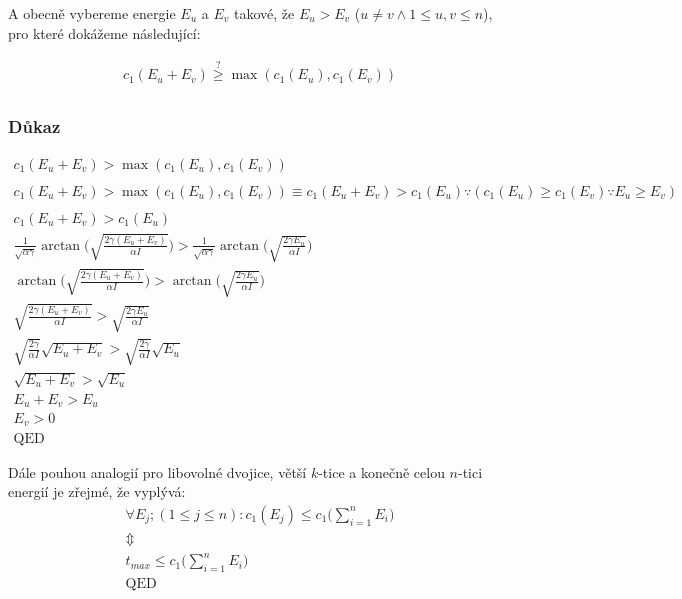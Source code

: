 \documentclass[12pt, a4paper,
 twoside,        %
 openright
]{report}
\begin{document}
A obecně vybereme energie $E_u$ a $E_v$ takové, že $E_u > E_v$ ($u \neq v \wedge 1 \leq u, v \leq n$), pro které dokážeme následující:

\begin{equation}
    \label{eq:max_runtime_proof_p3}
    \begin{gathered}
        c_1(E_u+E_v) \stackrel{?}{\geq} \max(c_1(E_u), c_1(E_v)) \\
    \end{gathered}
\end{equation}

\clearpage

\subsubsection{Důkaz}
\begin{equation}
    \label{eq:max_runtime_proof_p4}
    \begin{gathered}
        c_1(E_u+E_v) > \max(c_1(E_u), c_1(E_v)) \\
        \\
        c_1(E_u+E_v) > \max(c_1(E_u), c_1(E_v)) \equiv c_1(E_u+E_v) > c_1(E_u) \because (c_1(E_u)\geq c_1(E_v) \because E_u \geq E_v) \\
        \\
        c_1(E_u+E_v) > c_1(E_u) \\
        \frac{1}{\sqrt{\alpha\gamma}} \arctan{ \bigg( \sqrt{\frac{2 \gamma (E_u+E_v)}{\alpha I}} \bigg)} > \frac{1}{\sqrt{\alpha\gamma}} \arctan{ \bigg( \sqrt{\frac{2 \gamma E_u}{\alpha I}} \bigg)} \\
        \arctan{ \bigg( \sqrt{\frac{2 \gamma (E_u+E_v)}{\alpha I}} \bigg)} > \arctan{ \bigg( \sqrt{\frac{2 \gamma E_u}{\alpha I}} \bigg)} \\
        \sqrt{\frac{2 \gamma (E_u+E_v)}{\alpha I}} > \sqrt{\frac{2 \gamma E_u}{\alpha I}}\\
        \sqrt{\frac{2 \gamma }{\alpha I}} \sqrt{E_u+E_v} > \sqrt{\frac{2 \gamma}{\alpha I}} \sqrt{E_u}\\
        \sqrt{E_u+E_v} > \sqrt{E_u}\\
        E_u+E_v > E_u\\
        E_v > 0\\
        \text{QED}
    \end{gathered}
\end{equation}

Dále pouhou analogií pro libovolné dvojice, větší $k$-tice a konečně celou $n$-tici energií je zřejmé, že vyplývá:
\begin{equation}
    \label{eq:max_runtime_proof_p5}
    \begin{gathered}
        \forall E_j; (1 \leq j \leq n): c_1(E_j) \leq c_1 \Bigg(\sum_{i=1}^n E_i \Bigg) \\ 
        \Updownarrow \\
        t_{max} \leq c_1 \Bigg(\sum_{i=1}^n E_i \Bigg) \\ 
        \text{QED}
    \end{gathered}
\end{equation}
\end{document}
